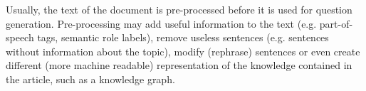 \documentclass[12pt, twoside]{fithesis2}
\renewcommand{\_}{\leavevmode \kern0.07em\vbox{\hrule width0.4em}}
\begin{document}
Usually, the text of the document is pre-processed before it is used for question generation.
Pre-processing may
add useful information to the text (e.g. part-of-speech tags, semantic role labels),
remove useless sentences (e.g. sentences without information about the topic),
modify (rephrase) sentences or even create different (more machine readable) representation of the knowledge contained in the article, such as a knowledge graph.
\end{document}
